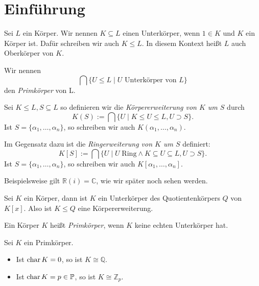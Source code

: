 \section{Einführung}

\begin{definition}
    Sei $L$ ein Körper. Wir nennen $K \subseteq L$ einen Unterkörper, wenn $1 \in K$ und $K$ ein Körper ist. Dafür schreiben wir auch $K \leq L$. In diesem Kontext heißt $L$ auch Oberkörper von $K$.

    Wir nennen
    $$ \bigcap \{ U \leq L \mid U \text{ Unterkörper von } L \} $$
    den \emph{Primkörper} von L.

    Sei $K \leq L, S \subseteq L$ so definieren wir die \emph{Körpererweiterung von $K$ um $S$} durch
    $$ K(S) := \bigcap \{ U \mid K \leq U \leq L, U \supset S \}. $$
    Ist $S = \{ \alpha_1, \hdots, \alpha_n \}$, so schreiben wir auch $K(\alpha_1, \hdots, \alpha_n)$.
    
    Im Gegensatz dazu ist die \emph{Ringerweiterung von $K$ um $S$} definiert:
    $$ K[S] := \bigcap \{ U \mid U \;\mathrm{Ring}\land K \subseteq U \subseteq L, U \supset S \}. $$
    Ist $S = \{ \alpha_1, \hdots, \alpha_n \}$, so schreiben wir auch $K[\alpha_1, \hdots, \alpha_n]$.
\end{definition}

\begin{remark}
    Beispielsweise gilt $\mathbb{R}(i) = \mathbb{C}$, wie wir später noch sehen werden.
\end{remark}

\begin{remark}
    Sei $K$ ein Körper, dann ist $K$ ein Unterkörper des Quotientenkörpers $Q$ von $K[x]$. Also ist $K \leq Q$ eine Körpererweiterung.
\end{remark}

\begin{definition}
    Ein Körper $K$ heißt \emph{Primkörper}, wenn $K$ keine echten Unterkörper hat.
\end{definition}

\begin{theorem}
    Sei $K$ ein Primkörper.
    \begin{itemize}
        \item Ist $\operatorname{char} K = 0$, so ist $K \cong \mathbb{Q}$.
        \item Ist $\operatorname{char} K = p \in \mathbb{P}$, so ist $K \cong \mathbb{Z}_p$.
    \end{itemize}
\end{theorem}

